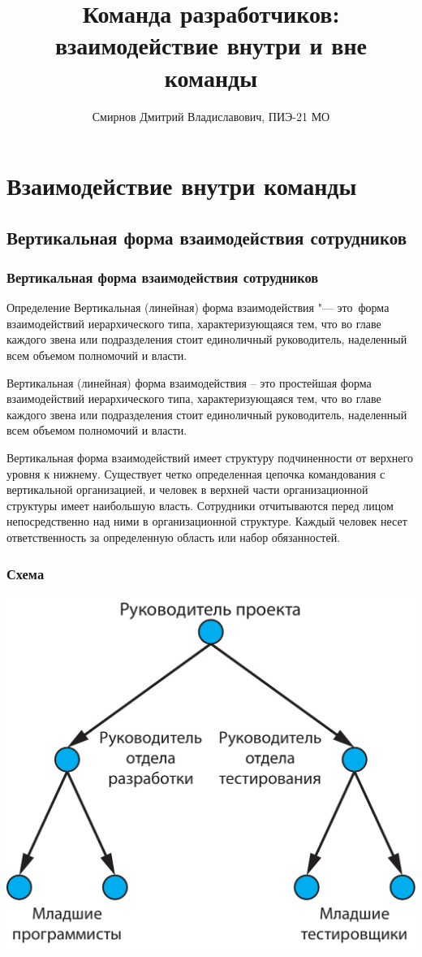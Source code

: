 \documentclass{../industrial-development}
\title{Команда разработчиков: взаимодействие внутри и вне команды}
\author{Смирнов Дмитрий Владиславович, ПИЭ-21 МО}
\date{}
\begin{document}
\begin{frame}
  \titlepage
\end{frame}


\section{Взаимодействие внутри команды}

\subsection{Вертикальная форма взаимодействия сотрудников}

\begin{frame} \frametitle{Вертикальная форма взаимодействия сотрудников}
  \begin{block}{Определение}
Вертикальная (линейная) форма взаимодействия "--- это~форма взаимодействий иерархического типа, характеризующаяся тем, что во главе каждого звена или подразделения стоит единоличный руководитель, наделенный всем объемом полномочий и власти. 
  \end{block}
\end{frame}

\lecturenotes
Вертикальная (линейная) форма взаимодействия –  это простейшая форма взаимодействий иерархического типа, характеризующаяся тем, что во главе каждого звена или подразделения стоит единоличный руководитель, наделенный всем объемом полномочий и власти. 

 Вертикальная форма взаимодействий имеет структуру подчиненности от верхнего уровня к нижнему. Существует четко определенная цепочка командования с вертикальной организацией, и человек в верхней части организационной структуры имеет наибольшую власть. Сотрудники отчитываются перед лицом непосредственно над ними в организационной структуре. Каждый человек несет ответственность за определенную область или набор обязанностей.

\begin{frame} \frametitle{Схема}
	\centerline{\includegraphics[width=1\textwidth]{vertical.pdf}}
\end{frame}
\end{document}
